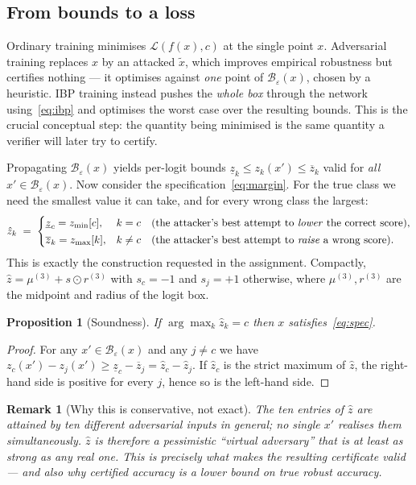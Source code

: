 \documentclass[11pt,a4paper]{article}
\newcommand{\eps}{\varepsilon}
\newcommand{\B}{\mathcal{B}}
\newcommand{\lb}[1]{\underline{#1}}
\newcommand{\ub}[1]{\overline{#1}}
\newtheorem{proposition}{Proposition}
\newtheorem{remark}{Remark}
\begin{document}
\subsection{From bounds to a loss}
Ordinary training minimises $\mathcal{L}(f(x),c)$ at the single point $x$.
Adversarial training replaces $x$ by an attacked $\tilde x$, which improves
empirical robustness but certifies nothing --- it optimises against \emph{one}
point of $\B_\eps(x)$, chosen by a heuristic. IBP training instead pushes the
\emph{whole box} through the network using~\eqref{eq:ibp} and optimises the
worst case over the resulting bounds. This is the crucial conceptual step: the
quantity being minimised is the same quantity a verifier will later try to
certify.

Propagating $\B_\eps(x)$ yields per-logit bounds
$\lb{z}_k\le z_k(x')\le\ub{z}_k$ valid for \emph{all} $x'\in\B_\eps(x)$. Now
consider the specification~\eqref{eq:margin}. For the true class we need the
smallest value it can take, and for every wrong class the largest:
\begin{equation}
\hat z_k \;=\;
\begin{cases}
\lb{z}_c = z_{\min}[c], & k=c \quad\text{(the attacker's best attempt to \emph{lower} the correct score)},\\[2pt]
\ub{z}_k = z_{\max}[k], & k\neq c \quad\text{(the attacker's best attempt to \emph{raise} a wrong score)} .
\end{cases}
\label{eq:zhat}
\end{equation}
This is exactly the construction requested in the assignment. Compactly,
$\hat z = \mu^{(3)} + s\odot r^{(3)}$ with $s_c=-1$ and $s_j=+1$ otherwise,
where $\mu^{(3)},r^{(3)}$ are the midpoint and radius of the logit box.

\begin{proposition}[Soundness]
If $\arg\max_k \hat z_k = c$ then $x$ satisfies~\eqref{eq:spec}.
\end{proposition}
\begin{proof}
For any $x'\in\B_\eps(x)$ and any $j\neq c$ we have
$z_c(x')-z_j(x') \ge \lb{z}_c-\ub{z}_j = \hat z_c-\hat z_j$. If $\hat z_c$ is the
strict maximum of $\hat z$, the right-hand side is positive for every $j$, hence
so is the left-hand side.
\end{proof}

\begin{remark}[Why this is conservative, not exact]
The ten entries of $\hat z$ are attained by ten \emph{different} adversarial
inputs in general; no single $x'$ realises them simultaneously. $\hat z$ is
therefore a pessimistic ``virtual adversary'' that is at least as strong as any
real one. This is precisely what makes the resulting certificate valid --- and
also why certified accuracy is a lower bound on true robust accuracy.
\end{remark}
\end{document}
